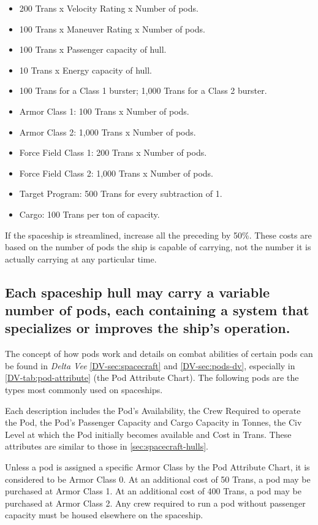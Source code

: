 \begin{itemize}
\item 200 Trans x Velocity Rating x Number of pods. 
\item 100 Trans x Maneuver Rating x Number of pods. 
\item 100 Trans x Passenger capacity of hull. 
\item 10 Trans x Energy capacity of hull. 
\item 100 Trans for a Class 1 burster; 1,000 Trans for a Class 2 burster. 
\item Armor Class 1: 100 Trans x Number of pods. 
\item Armor Class 2: 1,000 Trans x Number of pods. 
\item Force Field Class 1: 200 Trans x Number of pods. 
\item Force Field Class 2: 1,000 Trans x Number of pods. 
\item Target Program: 500 Trans for every subtraction of 1. 
\item Cargo: 100 Trans per ton of capacity. 
\end{itemize}

If the spaceship is streamlined, increase all the preceding by 50\%.
These costs are based on the number of pods the ship is capable of
carrying, not the number it is actually carrying at any particular
time.

\subsection[Spacecraft Pods]{Each spaceship hull may carry a variable
  number of pods, 
  each containing a system that specializes or improves the ship's
  operation.}
\label{sec:pods}



The concept of how pods work and details on combat abilities of
certain pods can be found in \emph{Delta Vee} \ref{DV-sec:spacecraft}
and \ref{DV-sec:pods-dv}, especially in \ref{DV-tab:pod-attribute}
(the Pod Attribute Chart). The following pods are the types most
commonly used on spaceships.

Each description includes the Pod's Availability, the Crew Required to
operate the Pod, the Pod's Passenger Capacity and Cargo Capacity in
Tonnes, the Civ Level at which the Pod initially becomes available and
Cost in Trans.  These attributes are similar to those in
\ref{sec:spacecraft-hulls}.

Unless a pod is assigned a specific Armor Class by the Pod Attribute
Chart, it is considered to be Armor Class 0. At an additional cost of
50 Trans, a pod may be purchased at Armor Class 1. At an additional
cost of 400 Trans, a pod may be purchased at Armor Class 2. Any crew
required to run a pod without passenger capacity must be housed
elsewhere on the spaceship.

